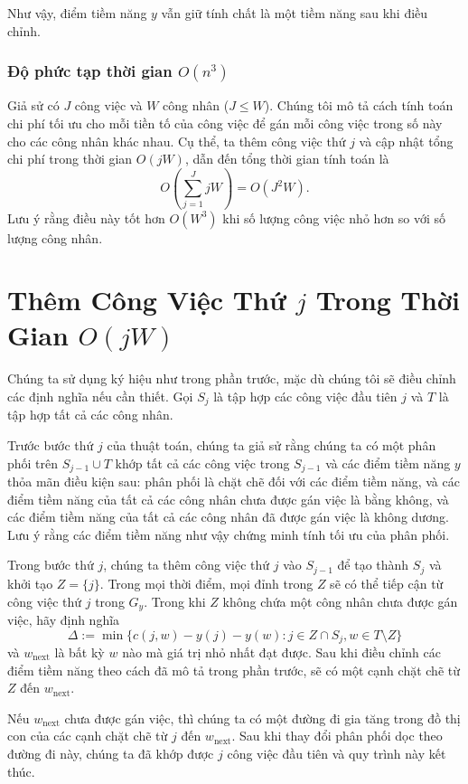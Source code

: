 Như vậy, điểm tiềm năng \( y \) vẫn giữ tính chất là một tiềm năng sau khi điều chỉnh.


\subsubsection{Độ phức tạp thời gian \( O(n^3) \)}

Giả sử có \( J \) công việc và \( W \) công nhân (\( J \leq W \)). Chúng tôi mô tả cách tính toán chi phí tối ưu cho mỗi tiền tố của công việc để gán mỗi công việc trong số này cho các công nhân khác nhau. Cụ thể, ta thêm công việc thứ \( j \) và cập nhật tổng chi phí trong thời gian \( O(jW) \), dẫn đến tổng thời gian tính toán là
\[
O\left(\sum_{j=1}^{J} jW\right) = O(J^2 W).
\]
Lưu ý rằng điều này tốt hơn \( O(W^3) \) khi số lượng công việc nhỏ hơn so với số lượng công nhân.
\section*{Thêm Công Việc Thứ \( j \) Trong Thời Gian \( O(jW) \)}

Chúng ta sử dụng ký hiệu như trong phần trước, mặc dù chúng tôi sẽ điều chỉnh các định nghĩa nếu cần thiết. Gọi \( S_j \) là tập hợp các công việc đầu tiên \( j \) và \( T \) là tập hợp tất cả các công nhân.

Trước bước thứ \( j \) của thuật toán, chúng ta giả sử rằng chúng ta có một phân phối trên \( S_{j-1} \cup T \) khớp tất cả các công việc trong \( S_{j-1} \) và các điểm tiềm năng \( y \) thỏa mãn điều kiện sau: phân phối là chặt chẽ đối với các điểm tiềm năng, và các điểm tiềm năng của tất cả các công nhân chưa được gán việc là bằng không, và các điểm tiềm năng của tất cả các công nhân đã được gán việc là không dương. Lưu ý rằng các điểm tiềm năng như vậy chứng minh tính tối ưu của phân phối.

Trong bước thứ \( j \), chúng ta thêm công việc thứ \( j \) vào \( S_{j-1} \) để tạo thành \( S_j \) và khởi tạo \( Z = \{ j \} \). Trong mọi thời điểm, mọi đỉnh trong \( Z \) sẽ có thể tiếp cận từ công việc thứ \( j \) trong \( G_y \). Trong khi \( Z \) không chứa một công nhân chưa được gán việc, hãy định nghĩa
\[
\Delta := \min \{ c(j, w) - y(j) - y(w) : j \in Z \cap S_j, w \in T \setminus Z \}
\]
và \( w_{\text{next}} \) là bất kỳ \( w \) nào mà giá trị nhỏ nhất đạt được. Sau khi điều chỉnh các điểm tiềm năng theo cách đã mô tả trong phần trước, sẽ có một cạnh chặt chẽ từ \( Z \) đến \( w_{\text{next}} \).

Nếu \( w_{\text{next}} \) chưa được gán việc, thì chúng ta có một đường đi gia tăng trong đồ thị con của các cạnh chặt chẽ từ \( j \) đến \( w_{\text{next}} \). Sau khi thay đổi phân phối dọc theo đường đi này, chúng ta đã khớp được \( j \) công việc đầu tiên và quy trình này kết thúc.

